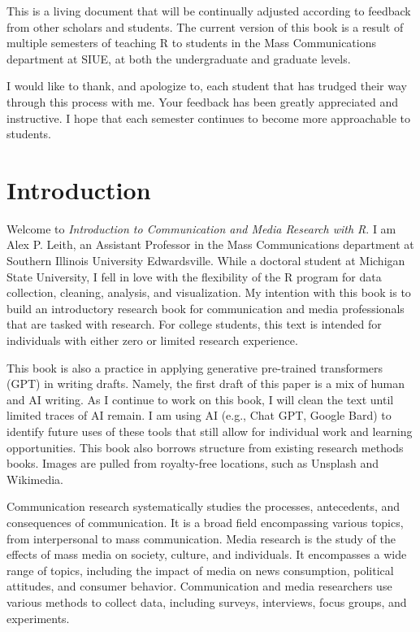 \documentclass[
  b5paper]{book}
\begin{document}
This is a living document that will be continually adjusted according to feedback from other scholars and students. The current version of this book is a result of multiple semesters of teaching R to students in the Mass Communications department at SIUE, at both the undergraduate and graduate levels.

I would like to thank, and apologize to, each student that has trudged their way through this process with me. Your feedback has been greatly appreciated and instructive. I hope that each semester continues to become more approachable to students.

\hypertarget{introduction}{%
\chapter{Introduction}\label{introduction}}

Welcome to \emph{Introduction to Communication and Media Research with R}. I am Alex P. Leith, an Assistant Professor in the Mass Communications department at Southern Illinois University Edwardsville. While a doctoral student at Michigan State University, I fell in love with the flexibility of the R program for data collection, cleaning, analysis, and visualization. My intention with this book is to build an introductory research book for communication and media professionals that are tasked with research. For college students, this text is intended for individuals with either zero or limited research experience.

This book is also a practice in applying generative pre-trained transformers (GPT) in writing drafts. Namely, the first draft of this paper is a mix of human and AI writing. As I continue to work on this book, I will clean the text until limited traces of AI remain. I am using AI (e.g., Chat GPT, Google Bard) to identify future uses of these tools that still allow for individual work and learning opportunities. This book also borrows structure from existing research methods books. Images are pulled from royalty-free locations, such as Unsplash and Wikimedia.

Communication research systematically studies the processes, antecedents, and consequences of communication. It is a broad field encompassing various topics, from interpersonal to mass communication. Media research is the study of the effects of mass media on society, culture, and individuals. It encompasses a wide range of topics, including the impact of media on news consumption, political attitudes, and consumer behavior. Communication and media researchers use various methods to collect data, including surveys, interviews, focus groups, and experiments.
\end{document}
